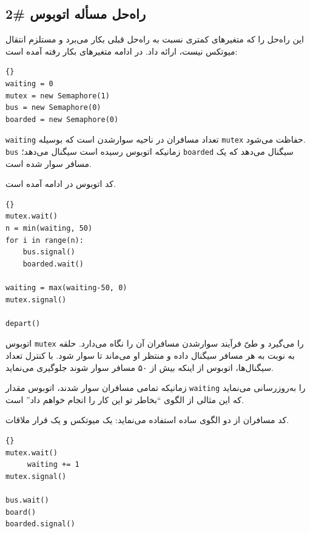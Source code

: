 \documentclass{book}
\newcommand{\clearemptydoublepage}{\newpage\cleardoublepage}
\begin{document}
\clearemptydoublepage
\subsection {راه‌حل مسأله اتوبوس \#2}

    این راه‌حل را که متغیرهای کمتری نسبت به راه‌حل قبلی بکار می‌برد و  مستلزم انتقال میوتکس نیست،  ارائه داد. در ادامه متغیرهای بکار رفته آمده است:

\begin{latin}
\begin{lstlisting}[title=\rl{راه‌حل \#2 مسأله اتوبوس  (مقداردهی اولیه)}]{}
waiting = 0
mutex = new Semaphore(1)
bus = new Semaphore(0)
boarded = new Semaphore(0)
\end{lstlisting}
\end{latin}

    {\tt waiting} 
    تعداد مسافران در ناحیه سوارشدن است که بوسیله {\tt mutex} حفاظت می‌شود.  {\tt bus} زمانیکه اتوبوس رسیده است سیگنال می‌دهد؛     {\tt boarded} 
    سیگنال می‌دهد که یک مسافر سوار شده است. 

    کد اتوبوس در ادامه آمده است. 

\begin{latin}
\begin{lstlisting}[title=\rl{راه‌حل اتوبوس (اتوبوس)}]{}
mutex.wait()
n = min(waiting, 50)
for i in range(n):
    bus.signal()
    boarded.wait()

waiting = max(waiting-50, 0)
mutex.signal()

depart()
\end{lstlisting}
\end{latin}

    اتوبوس {\tt mutex}  را می‌گیرد و طیّ فرآیند سوارشدن مسافران آن را نگاه می‌دارد. 
    حلقه به نوبت به هر مسافر  سیگنال داده  و منتظر او می‌ماند تا سوار شود. 
    با کنترل تعداد سیگنال‌ها، اتوبوس از اینکه بیش از ۵۰ مسافر سوار شوند جلوگیری می‌نماید. 

    زمانیکه تمامی مسافران سوار شدند، اتوبوس مقدار  {\tt waiting} را به‌روزرسانی می‌نماید که این مثالی از الگوی ``بخاطر تو  این کار را انجام خواهم داد'' است. 

    کد مسافران از دو الگوی ساده استفاده می‌نماید: یک میوتکس و یک قرار ملاقات. 

\begin{latin}
\begin{lstlisting}[title=\rl{راه‌حل اتوبوس (مسافران)}]{}
mutex.wait()
     waiting += 1
mutex.signal()

bus.wait()
board()
boarded.signal()
\end{lstlisting}
\end{latin}
\end{document}
